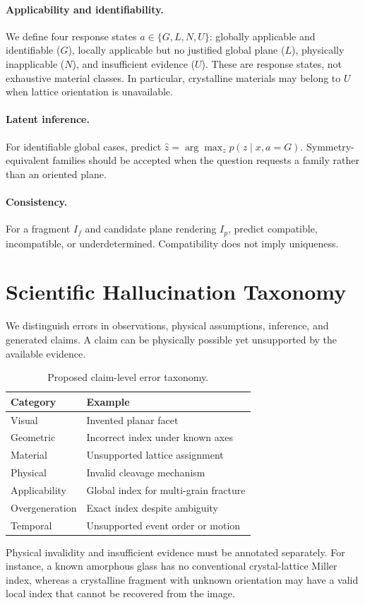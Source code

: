 \documentclass[11pt]{article}
\begin{document}
\paragraph{Applicability and identifiability.} We define four response states $a\in\{G,L,N,U\}$: globally applicable and identifiable ($G$), locally applicable but no justified global plane ($L$), physically inapplicable ($N$), and insufficient evidence ($U$). These are response states, not exhaustive material classes. In particular, crystalline materials may belong to $U$ when lattice orientation is unavailable.
\paragraph{Latent inference.} For identifiable global cases, predict $\hat z=\arg\max_z p(z\mid x,a=G)$. Symmetry-equivalent families should be accepted when the question requests a family rather than an oriented plane.
\paragraph{Consistency.} For a fragment $I_f$ and candidate plane rendering $I_p$, predict compatible, incompatible, or underdetermined. Compatibility does not imply uniqueness.
\section{Scientific Hallucination Taxonomy}
We distinguish errors in observations, physical assumptions, inference, and generated claims. A claim can be physically possible yet unsupported by the available evidence.
\begin{table}[t]\small\centering
\begin{tabularx}{\columnwidth}{lX}\toprule
Category & Example \\ \midrule
Visual & Invented planar facet \\
Geometric & Incorrect index under known axes \\
Material & Unsupported lattice assignment \\
Physical & Invalid cleavage mechanism \\
Applicability & Global index for multi-grain fracture \\
Overgeneration & Exact index despite ambiguity \\
Temporal & Unsupported event order or motion \\
\bottomrule\end{tabularx}
\caption{Proposed claim-level error taxonomy.}\label{tab:taxonomy}
\end{table}
Physical invalidity and insufficient evidence must be annotated separately. For instance, a known amorphous glass has no conventional crystal-lattice Miller index, whereas a crystalline fragment with unknown orientation may have a valid local index that cannot be recovered from the image.
\end{document}
